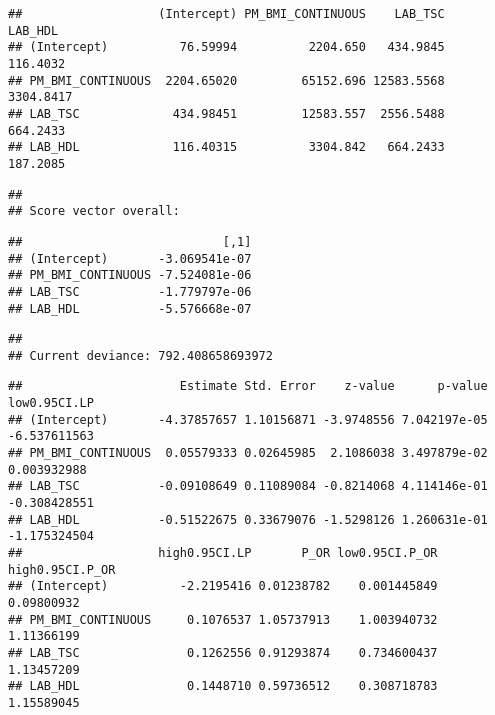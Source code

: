 \documentclass[
]{book}
\newenvironment{Shaded}{\begin{snugshade}}{\end{snugshade}}
\newcommand{\DataTypeTok}[1]{\textcolor[rgb]{0.13,0.29,0.53}{#1}}
\newcommand{\KeywordTok}[1]{\textcolor[rgb]{0.13,0.29,0.53}{\textbf{#1}}}
\newcommand{\NormalTok}[1]{#1}
\newcommand{\OperatorTok}[1]{\textcolor[rgb]{0.81,0.36,0.00}{\textbf{#1}}}
\newcommand{\StringTok}[1]{\textcolor[rgb]{0.31,0.60,0.02}{#1}}
\begin{document}
\begin{verbatim}
##                   (Intercept) PM_BMI_CONTINUOUS    LAB_TSC   LAB_HDL
## (Intercept)          76.59994          2204.650   434.9845  116.4032
## PM_BMI_CONTINUOUS  2204.65020         65152.696 12583.5568 3304.8417
## LAB_TSC             434.98451         12583.557  2556.5488  664.2433
## LAB_HDL             116.40315          3304.842   664.2433  187.2085
\end{verbatim}

\begin{verbatim}
## 
## Score vector overall:
\end{verbatim}

\begin{verbatim}
##                            [,1]
## (Intercept)       -3.069541e-07
## PM_BMI_CONTINUOUS -7.524081e-06
## LAB_TSC           -1.779797e-06
## LAB_HDL           -5.576668e-07
\end{verbatim}

\begin{verbatim}
## 
## Current deviance: 792.408658693972
\end{verbatim}

\begin{Shaded}
\end{Shaded}

\begin{verbatim}
##                      Estimate Std. Error    z-value      p-value low0.95CI.LP
## (Intercept)       -4.37857657 1.10156871 -3.9748556 7.042197e-05 -6.537611563
## PM_BMI_CONTINUOUS  0.05579333 0.02645985  2.1086038 3.497879e-02  0.003932988
## LAB_TSC           -0.09108649 0.11089084 -0.8214068 4.114146e-01 -0.308428551
## LAB_HDL           -0.51522675 0.33679076 -1.5298126 1.260631e-01 -1.175324504
##                   high0.95CI.LP       P_OR low0.95CI.P_OR high0.95CI.P_OR
## (Intercept)          -2.2195416 0.01238782    0.001445849      0.09800932
## PM_BMI_CONTINUOUS     0.1076537 1.05737913    1.003940732      1.11366199
## LAB_TSC               0.1262556 0.91293874    0.734600437      1.13457209
## LAB_HDL               0.1448710 0.59736512    0.308718783      1.15589045
\end{verbatim}
\end{document}
